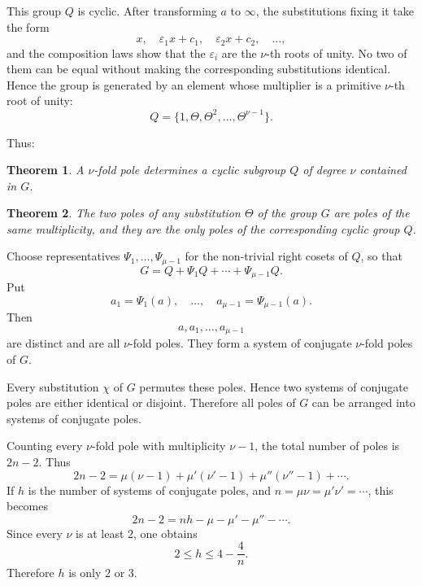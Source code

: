 \documentclass[11pt,a4paper]{book}
\newtheorem*{theorem*}{Theorem}
\begin{document}
This group $Q$ is cyclic.  After transforming $a$ to $\infty$, the substitutions fixing it take the form
\[
 x,
 \quad \varepsilon_1x+c_1,
 \quad \varepsilon_2x+c_2,
 \quad\ldots,
\]
and the composition laws show that the $\varepsilon_i$ are the $\nu$-th roots of unity.  No two of them can be equal without making the corresponding substitutions identical.  Hence the group is generated by an element whose multiplier is a primitive $\nu$-th root of unity:
\begin{equation}\label{eq:w9-Q-cyclic}
 Q=\{1,\Theta,\Theta^2,\ldots,\Theta^{\nu-1}\}.
\end{equation}

Thus:

\begin{theorem*}
A $\nu$-fold pole determines a cyclic subgroup $Q$ of degree $\nu$ contained in $G$.
\end{theorem*}

\begin{theorem*}
The two poles of any substitution $\Theta$ of the group $G$ are poles of the same multiplicity, and they are the only poles of the corresponding cyclic group $Q$.
\end{theorem*}

Choose representatives $\Psi_1,\ldots,\Psi_{\mu-1}$ for the non-trivial right cosets of $Q$, so that
\begin{equation}\label{eq:w9-cosets}
 G=Q+\Psi_1Q+\cdots+\Psi_{\mu-1}Q.
\end{equation}
Put
\begin{equation}\label{eq:w9-conj-poles}
 a_1=\Psi_1(a),\quad\ldots,\quad a_{\mu-1}=\Psi_{\mu-1}(a).
\end{equation}
Then
\[
 a,a_1,\ldots,a_{\mu-1}
\]
are distinct and are all $\nu$-fold poles.  They form a system of conjugate $\nu$-fold poles of $G$.

Every substitution $\chi$ of $G$ permutes these poles.  Hence two systems of conjugate poles are either identical or disjoint.  Therefore all poles of $G$ can be arranged into systems of conjugate poles.

Counting every $\nu$-fold pole with multiplicity $\nu-1$, the total number of poles is $2n-2$.  Thus
\begin{equation}\label{eq:w9-pole-count}
 2n-2=\mu(\nu-1)+\mu'(\nu'-1)+\mu''(\nu''-1)+\cdots.
\end{equation}
If $h$ is the number of systems of conjugate poles, and $n=\mu\nu=\mu'\nu'=\cdots$, this becomes
\begin{equation}\label{eq:w9-h-count}
 2n-2=nh-\mu-\mu'-\mu''-\cdots.
\end{equation}
Since every $\nu$ is at least $2$, one obtains
\[
 2\le h\le 4-\frac4n.
\]
Therefore $h$ is only $2$ or $3$.
\end{document}
